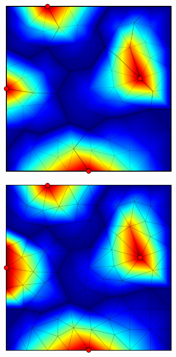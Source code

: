 \begin{figure}[htbp]
  \begin{subfigure}[t]{0.3\textwidth}
    \centerline{\includegraphics[width=0.9\linewidth]{figs/square_tria_metis_node_conv}}
  \end{subfigure}
  \hfill
  \begin{subfigure}[t]{0.3\textwidth}
    \centerline{\includegraphics[width=0.9\linewidth]{figs/square_tria_metis_node_conv_bc_nonsymm}}

\end{subfigure}
\end{figure}
